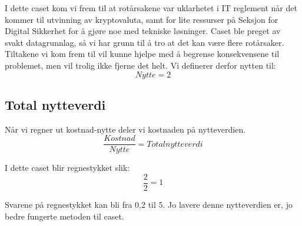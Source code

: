 I dette caset kom vi frem til at rotårsakene var uklarhetet i IT reglement når det kommer til utvinning av kryptovaluta, samt for lite ressurser på Seksjon for Digital Sikkerhet for å gjøre noe med tekniske løsninger. Caset ble preget av svakt datagrunnlag, så vi har grunn til å tro at det kan være flere rotårsaker. Tiltakene vi kom frem til vil kunne hjelpe med å begrense konsekvensene til problemet, men vil trolig ikke fjerne det helt. Vi definerer derfor nytten til:
\[Nytte = 2\]

\subsection{Total nytteverdi}
Når vi regner ut kostnad-nytte deler vi kostnaden på nytteverdien. 
\[\frac{Kostnad}{Nytte} = Total nytteverdi\]

I dette caset blir regnestykket slik:
\[\frac{2}{2} = 1\]

Svarene på regnestykket kan bli fra 0,2 til 5. Jo lavere denne nytteverdien er, jo bedre fungerte metoden til caset. 